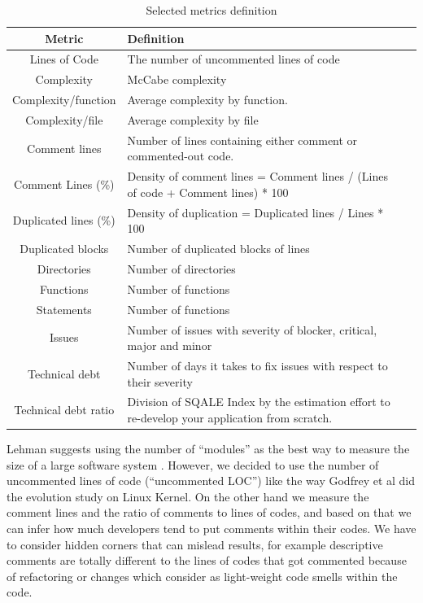 \begin{table}[!hbt]
	\begin{center}
		\caption{Selected metrics definition}
		\label{tab:metrics_definition}
		\begin{tabular}{c| l l }
			\toprule
		
			\textbf{Metric} & \textbf{Definition} \\ \midrule
			Lines of Code & The number of uncommented lines of code    \\
			Complexity      & McCabe complexity    \\
			Complexity/function & Average complexity by function. \\
			Complexity/file & Average complexity by file \\
			Comment lines  & Number of lines containing either comment or commented-out code. \\
			Comment Lines (\%)   & Density of comment lines = Comment lines / (Lines of code + Comment lines) * 100    \\
			Duplicated lines (\%)     & Density of duplication = Duplicated lines / Lines * 100    \\
			Duplicated blocks   & Number of duplicated blocks of lines    \\
			Directories   & Number of directories    \\
			Functions            & Number of functions    \\
			Statements      & Number of functions   \\
			Issues    & Number of issues with severity of blocker, critical, major and minor   \\
			Technical debt    & Number of days it takes to fix issues with respect to their severity    \\
			Technical debt ratio   & Division of SQALE Index by the estimation effort to re-develop your application from scratch.    \\
		\end{tabular}
	\end{center}
\end{table}



\par
Lehman suggests using the number of “modules” as the best way to measure the size of a large software system \cite{Lehman1997METRICS}. However, we decided to use the number of uncommented lines of code (“uncommented LOC”) like the way Godfrey et al \cite{Godfrey2000ICMS} did the evolution study on Linux Kernel. On the other hand we measure the comment lines and the ratio of comments to lines of codes, and based on that we can infer how much developers tend to put comments within their codes. We have to consider hidden corners that can mislead results, for example descriptive comments are totally different to the lines of codes that got commented because of refactoring or changes which consider as light-weight code smells within the code.

